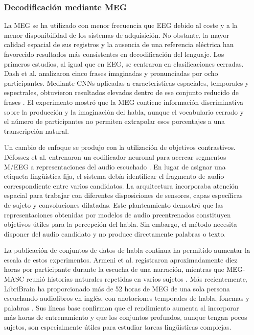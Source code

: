 \subsubsection{Decodificación mediante MEG}

La MEG se ha utilizado con menor frecuencia que EEG debido al coste y a la menor disponibilidad de los sistemas de adquisición. No obstante, la mayor calidad espacial de sus registros y la ausencia de una referencia eléctrica han favorecido resultados más consistentes en decodificación del lenguaje. Los primeros estudios, al igual que en EEG, se centraron en clasificaciones cerradas. Dash et al. analizaron cinco frases imaginadas y pronunciadas por ocho participantes. Mediante CNNs aplicadas a características espaciales, temporales y espectrales, obtuvieron resultados elevados dentro de ese conjunto reducido de frases \cite{dash2020megphrases}. El experimento mostró que la MEG contiene información discriminativa sobre la producción y la imaginación del habla, aunque el vocabulario cerrado y el número de participantes no permiten extrapolar esos porcentajes a una transcripción natural.

Un cambio de enfoque se produjo con la utilización de objetivos contrastivos. Défossez et al. entrenaron un codificador neuronal para acercar segmentos M/EEG a representaciones del audio escuchado \cite{defossez2023speech}. En lugar de asignar una etiqueta lingüística fija, el sistema debía identificar el fragmento de audio correspondiente entre varios candidatos. La arquitectura incorporaba atención espacial para trabajar con diferentes disposiciones de sensores, capas específicas de sujeto y convoluciones dilatadas. Este planteamiento demostró que las representaciones obtenidas por modelos de audio preentrenados constituyen objetivos útiles para la percepción del habla. Sin embargo, el método necesita disponer del audio candidato y no produce directamente palabras o texto.

La publicación de conjuntos de datos de habla continua ha permitido aumentar la escala de estos experimentos. Armeni et al. registraron aproximadamente diez horas por participante durante la escucha de una narración, mientras que MEG-MASC reunió historias naturales repetidas en varios sujetos \cite{armeni2022meg,gwilliams2023megmasc}. Más recientemente, LibriBrain ha proporcionado más de 52 horas de MEG de una sola persona escuchando audiolibros en inglés, con anotaciones temporales de habla, fonemas y palabras \cite{ozdogan2025libribrain}. Sus líneas base confirman que el rendimiento aumenta al incorporar más horas de entrenamiento y que los conjuntos profundos, aunque tengan pocos sujetos, son especialmente útiles para estudiar tareas lingüísticas complejas.

